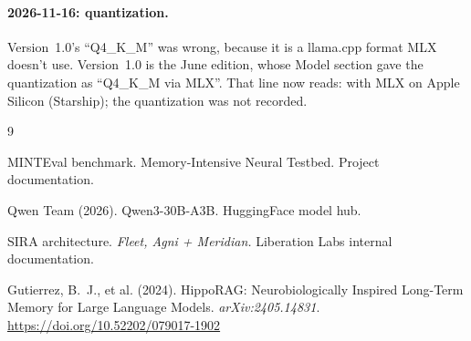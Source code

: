 \documentclass[11pt,a4paper]{article}
\begin{document}
\paragraph{2026-11-16: quantization.} Version~1.0's ``Q4\_K\_M'' was wrong, because it is a llama.cpp format MLX doesn't use. Version~1.0 is the June edition, whose Model section gave the quantization as ``Q4\_K\_M via MLX''. That line now reads: with MLX on Apple Silicon (Starship); the quantization was not recorded.

\begin{thebibliography}{9}

MINTEval benchmark.
Memory-Intensive Neural Testbed.
Project documentation.

Qwen Team (2026).
Qwen3-30B-A3B.
HuggingFace model hub.

SIRA architecture.
\textit{Fleet, Agni + Meridian.}
Liberation Labs internal documentation.

Gutierrez, B.~J., et al. (2024).
HippoRAG: Neurobiologically Inspired Long-Term Memory for Large Language Models.
\textit{arXiv:2405.14831}.
\url{https://doi.org/10.52202/079017-1902}

\end{thebibliography}
\end{document}
